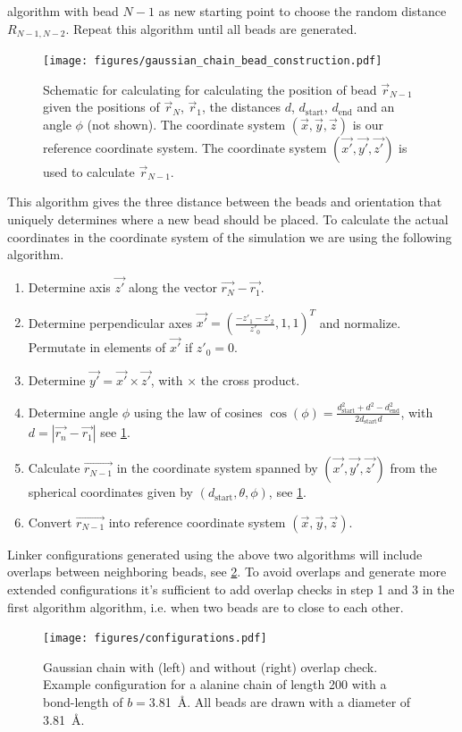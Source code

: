\documentclass[12pt, twoside]{report}
\begin{document}
algorithm with bead $N-1$ as new starting point to choose the random distance
\(R_{N-1,N-2}\). Repeat this algorithm until all beads are generated.
\begin{figure}[!ht] \centering
\texttt{[image: figures/gaussian\_chain\_bead\_construction.pdf]}
\caption[Illustration of generating bead positions for a Gaussian polymer
model.]{Schematic for calculating for calculating the position of bead
$\vec{r}_{N-1}$ given the positions of $\vec{r}_N$, $\vec{r}_1$, the distances
$d$, $d_{\mathrm{start}}$, $d_{\mathrm{end}}$ and an angle $\phi$ (not shown).
The coordinate system $(\vec{x}, \vec{y}, \vec{z})$ is our reference coordinate
system. The coordinate system $(\vec{x'}, \vec{y'}, \vec{z'})$ is used to
calculate $\vec{r}_{N-1}$.}
\label{fig:bead-construction}
\end{figure} This algorithm gives the three distance between the beads and
orientation that uniquely determines where a new bead should be placed. To
calculate the actual coordinates in the coordinate system of the simulation we
are using the following algorithm.
\begin{enumerate}
  \item Determine axis $\vec{z'}$ along the vector $\vec{r_N} - \vec{r_1}$.
  \item Determine perpendicular axes $\vec{x'}=\left(\frac{-z'_1-z'_2}{z'_0},1,
1\right)^T$ and normalize. Permutate in elements of $\vec{x'}$ if $z'_0=0$.
  \item Determine $\vec{y'} = \vec{x'} \times \vec{z'}$, with \(\times\) the
cross product.
  \item Determine angle \(\phi\) using the law of cosines
$\cos(\phi)=\frac{d_{\mathrm{start}}^2 + d^2 - d_{\mathrm{end}}^2}{ 2
d_{\mathrm{start}} d}$, with $d=|\vec{r_n} - \vec{r_1}|$ see
\cref{fig:bead-construction}.
  \item Calculate $\vec{r_{N-1}}$ in the coordinate system spanned by
$(\vec{x'}, \vec{y'}, \vec{z'})$ from the spherical coordinates given by
$(d_{\mathrm{start}}, \theta, \phi)$, see \cref{fig:bead-construction}.
  \item Convert $\vec{r_{N-1}}$ into reference coordinate system $(\vec{x},
\vec{y}, \vec{z})$.
\end{enumerate} Linker configurations generated using the above two algorithms
will include overlaps between neighboring beads, see \cref{fig:configuration}.
To avoid overlaps and generate more extended configurations it's sufficient to
add overlap checks in step 1 and 3 in the first algorithm algorithm, i.e. when
two beads are to close to each other.
\begin{figure}[!ht] \centering
\texttt{[image: figures/configurations.pdf]}
\caption[Example configuration generated for a Gaussian chain polymer model.]{
Gaussian chain with (left) and without (right) overlap check. Example
configuration for a alanine chain of length 200 with a bond-length of
$b=$\SI{3.81}{\AA}. All beads are drawn with a diameter of \SI{3.81}{\AA}.}
\label{fig:configuration}
\end{figure}
\end{document}

